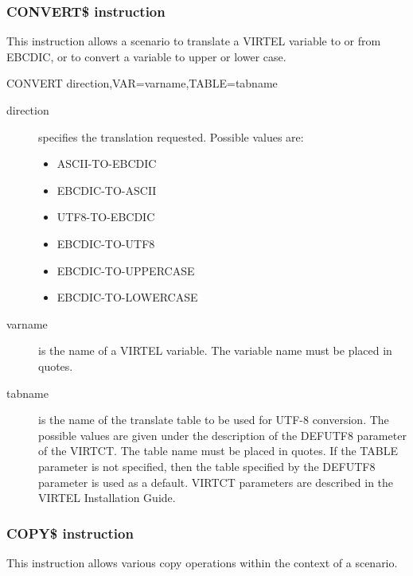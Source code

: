 \documentclass[letterpaper,10pt,english]{sphinxmanual}
\begin{document}
\subsubsection{CONVERT\$ instruction}
\label{\detokenize{User_Guide:convert-instruction}}
This instruction allows a scenario to translate a VIRTEL variable to or from EBCDIC, or to convert a variable to upper or
lower case.

\begin{sphinxVerbatim}[commandchars=\\\{\}]
CONVERT\PYGZdl{} direction,VAR=\PYGZsq{}varname\PYGZsq{},TABLE=\PYGZsq{}tabname\PYGZsq{}
\end{sphinxVerbatim}
\begin{description}
\item[{direction}] \leavevmode
specifies the translation requested. Possible values are:
\begin{itemize}
\item {} 
ASCII-TO-EBCDIC

\item {} 
EBCDIC-TO-ASCII

\item {} 
UTF8-TO-EBCDIC

\item {} 
EBCDIC-TO-UTF8

\item {} 
EBCDIC-TO-UPPERCASE

\item {} 
EBCDIC-TO-LOWERCASE

\end{itemize}

\item[{varname}] \leavevmode
is the name of a VIRTEL variable. The variable name must be placed in quotes.

\item[{tabname}] \leavevmode
is the name of the translate table to be used for UTF-8 conversion. The possible values are given under the description of the DEFUTF8 parameter of the VIRTCT. The table name must be placed in quotes. If the TABLE parameter is not specified, then the table specified by the DEFUTF8 parameter is used as a default. VIRTCT parameters are described in the VIRTEL Installation Guide.

\end{description}


\subsubsection{COPY\$ instruction}
\label{\detokenize{User_Guide:copy-instruction}}\label{\detokenize{User_Guide:v457ug-copy}}
This instruction allows various copy operations within the context of a scenario.
\end{document}
